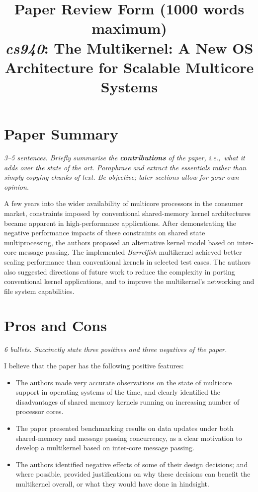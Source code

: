 \documentclass[11pt]{article}
\begin{document}
\title{Paper Review Form (1000 words maximum)\\
  \emph{cs940}: The Multikernel: A New OS Architecture
for Scalable Multicore Systems \cite{baumann2009multikernel}}
\maketitle

\section*{Paper Summary}
\textsl{3--5 sentences. Briefly summarise the {\bf contributions} of the paper, i.e.,~what it adds over the state of the art. Paraphrase and extract the essentials rather than simply copying chunks of text. Be objective; later sections allow for your own opinion.}

A few years into the wider availability of multicore processors in the consumer market, constraints imposed by conventional shared-memory kernel architectures became apparent in high-performance applications. After demonstrating the negative performance impacts of these constraints on shared state multiprocessing, the authors proposed an alternative kernel model based on inter-core message passing. The implemented \emph{Barrelfish} multikernel achieved better scaling performance than conventional kernels in selected test cases. The authors also suggested directions of future work to reduce the complexity in porting conventional kernel applications, and to improve the multikernel's networking and file system capabilities.

\section*{Pros and Cons}
\textsl{6 bullets. Succinctly state three positives and three negatives of the paper.}

I believe that the paper has the following positive features:
\begin{itemize}
	\item The authors made very accurate observations on the state of multicore support in operating systems of the time, and clearly identified the disadvantages of shared memory kernels running on increasing number of processor cores.
	\item The paper presented benchmarking results on data updates under both shared-memory and message passing concurrency, as a clear motivation to develop a multikernel based on inter-core message passing.
	\item The authors identified negative effects of some of their design decisions; and where possible, provided justifications on why these decisions can benefit the multikernel overall, or what they would have done in hindsight.
\end{itemize}
\end{document}

